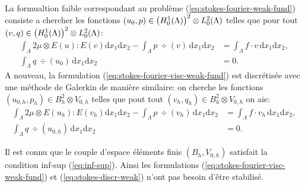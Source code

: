 La formualtion faible correspondant au problème
(\ref{eq:stokes-fourier-weak-fund}) consiste a chercher les fonctions
$(u_0,p)\in\left( H_0^1(\Lambda) \right)^2\otimes L_0^2(\Lambda)$ telles que
pour tout $(v, q)\in\left( H_0^1(\Lambda) \right)^2\otimes L_0^2(\Lambda)$:
\begin{equation}\label{eq:stokes-fourier-visc-weak-fund}
  \begin{aligned}
    \int_\Lambda 2\mu\otimes E(u):E(v)\mathrm dx_1\mathrm dx_2 -
    \int_\Lambda p\,\div(v)\,\mathrm dx_1\mathrm dx_2 &=
    \int_\Lambda f\cdot v\,\mathrm dx_1\mathrm dx_2,\\
    \int_\Lambda q\,\div(u_0)\,\mathrm dx_1\mathrm dx_2
    &= 0.
  \end{aligned}
\end{equation}
A nouveau, la formulation (\ref{eq:stokes-fourier-visc-weak-fund})
est discrétisée avec une méthode de Galerkin de manière
similaire: on cherche les fonctions $(u_{0,h},p_h)\in
B_{h}^2\otimes V_{0,h}$ telles que pout tout $(v_h,q_h)\in
B_{h}^2\otimes V_{0,h}$ on aie:
\begin{equation}\label{eq:stokes-fourier-visc-weak-fund}
  \begin{aligned}
    \int_\Lambda 2\mu\otimes E(u_h):E(v_h)\mathrm dx_1\mathrm dx_2 -
    \int_\Lambda p\,\div(v_h)\,\mathrm dx_1\mathrm dx_2 &=
    \int_\Lambda f\cdot v_h\,\mathrm dx_1\mathrm dx_2,\\
    \int_\Lambda q\,\div(u_{0,h})\,\mathrm dx_1\mathrm dx_2
    &= 0.
  \end{aligned}
\end{equation}

\begin{remarque}
  Il est connu que le couple d'espace éléments finis $(B_{h}, V_{0,h})$ satisfait la
  condition inf-sup (\ref{eq:inf-sup}). Ainsi les formulations
  (\ref{eq:stokes-fourier-visc-weak-fund}) et
  (\ref{eq:stokes-discr-weak}) n'ont pas besoin d'être stabilisé.
\end{remarque}



